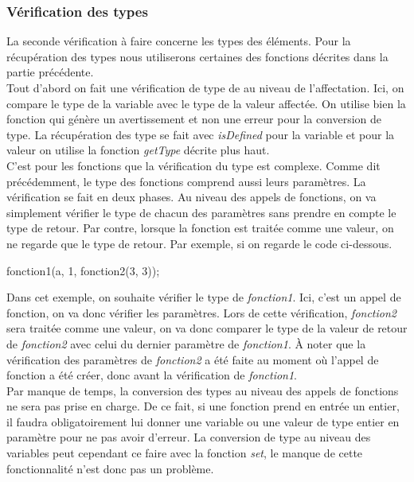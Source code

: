 \documentclass[a4paper]{article}%
\begin{document}
\subsubsection*{Vérification des types} %

La seconde vérification à faire concerne les types des éléments. Pour la
récupération des types nous utiliserons certaines des fonctions décrites dans la
partie précédente.\\

Tout d'abord on fait une vérification de type de au niveau de l'affectation.
Ici, on compare le type de la variable avec le type de la valeur affectée. On
utilise bien la fonction qui génère un avertissement et non une erreur pour la
conversion de type. La récupération des type se fait avec \textit{isDefined}
pour la variable et pour la valeur on utilise la fonction \textit{getType}
décrite plus haut.\\

C'est pour les fonctions que la vérification du type est complexe. Comme dit
précédemment, le type des fonctions comprend aussi leurs paramètres. La
vérification se fait en deux phases. Au niveau des appels de fonctions, on va
simplement vérifier le type de chacun des paramètres sans prendre en compte le
type de retour. Par contre, lorsque la fonction est traitée comme une valeur, on
ne regarde que le type de retour. Par exemple, si on regarde le code ci-dessous.

\begin{grammar}[language=C++]
  fonction1(a, 1, fonction2(3, 3));
\end{grammar}\leavevmode\newline

Dans cet exemple, on souhaite vérifier le type de \textit{fonction1}. Ici,
c'est un appel de fonction, on va donc vérifier les paramètres. Lors de cette
vérification, \textit{fonction2} sera traitée comme une valeur, on va donc
comparer le type de la valeur de retour de \textit{fonction2} avec celui du
dernier paramètre de \textit{fonction1}. À noter que la vérification des
paramètres de \textit{fonction2} a été faite au moment où l'appel de fonction a
été créer, donc avant la vérification de \textit{fonction1}.\\

Par manque de temps, la conversion des types au niveau des appels de fonctions
ne sera pas prise en charge. De ce fait, si une fonction prend en entrée un
entier, il faudra obligatoirement lui donner une variable ou une valeur de type
entier en paramètre pour ne pas avoir d'erreur. La conversion de type au niveau
des variables peut cependant ce faire avec la fonction \textit{set}, le manque
de cette fonctionnalité n'est donc pas un problème.\\
\end{document}
